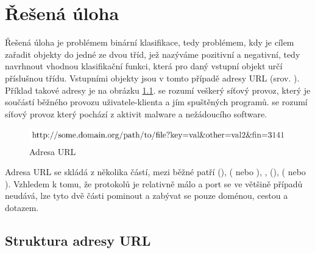 \chapter{Řešená úloha}\label{problem}

Řešená úloha je problémem binární klasifikace, tedy problémem, kdy je cílem zařadit objekty do jedné ze dvou tříd, jež nazýváme pozitivní a negativní, tedy navrhnout vhodnou klasifikační funkci, která pro daný vstupní objekt určí příslušnou třídu. Vstupními objekty jsou v tomto případě adresy URL (srov. \cite{berners-lee_uniform_1994}). Příklad takové adresy je na obrázku \ref{url}.  se rozumí veškerý síťový provoz, který je součástí běžného provozu uživatele-klienta a jím spuštěných programů.  se rozumí síťový provoz který pochází z aktivit malware a nežádoucího software.

\begin{figure}[h]
	\centering
	\includegraphics{images/url/url.pdf}
	\caption{Adresa URL}\label{url}
\end{figure}

Adresa URL se skládá z několika částí, mezi běžné patří  (),  ( nebo ), ,  (),  ( nebo ). Vzhledem k tomu, že protokolů je relativně málo a port se ve většině případů neudává, lze tyto dvě části pominout a zabývat se pouze doménou, cestou a dotazem.

\section{Struktura adresy URL}\label{URL_structure}

